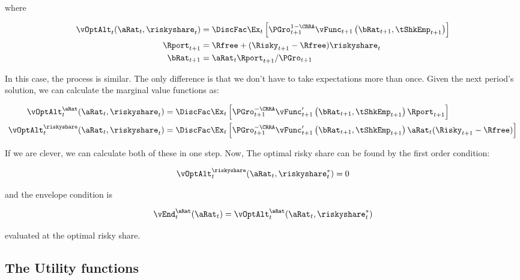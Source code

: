 \documentclass[\econtexRoot/EGMN]{subfiles}
\begin{document}
where

\begin{equation}
  \begin{split}
    \vOptAlt_{t}(\aRat_{t}, \riskyshare_{t}) & = \DiscFac \Ex_{t} \left[ \PGro_{t+1}^{1-\CRRA} \vFunc_{t+1}\left(\bRat_{t+1}, \tShkEmp_{t+1}\right)   \right] \\
    \Rport_{t+1} & = \Rfree + (\Risky_{t+1} - \Rfree) \riskyshare_{t} \\
    \bRat_{t+1} & = \aRat_{t} \Rport_{t+1} / \PGro_{t+1}
  \end{split}
\end{equation}

In this case, the process is similar. The only difference is that we don't have to take expectations more than once. Given the next period's solution, we can calculate the marginal value functions as:

\begin{equation}
  \begin{split}
    \vOptAlt_{t}^{\aRat}(\aRat_{t}, \riskyshare_{t}) & = \DiscFac \Ex_{t} \left[ \PGro_{t+1}^{-\CRRA} \vFunc_{t+1}'\left(\bRat_{t+1}, \tShkEmp_{t+1}\right) \Rport_{t+1}   \right] \\
    \vOptAlt_{t}^{\riskyshare}(\aRat_{t}, \riskyshare_{t}) & = \DiscFac \Ex_{t} \left[ \PGro_{t+1}^{-\CRRA} \vFunc_{t+1}'\left(\bRat_{t+1}, \tShkEmp_{t+1}\right) \aRat_{t} (\Risky_{t+1} - \Rfree)   \right] \\
  \end{split}
\end{equation}

If we are clever, we can calculate both of these in one step. Now, The optimal risky share can be found by the first order condition:

\begin{equation}
  \vOptAlt_{t}^{\riskyshare}(\aRat_{t}, \riskyshare_{t}^{*})  = 0
\end{equation}

and the envelope condition is

\begin{equation}
  \vEnd_{t}^{\aRat}(\aRat_{t}) = \vOptAlt_{t}^{\aRat}(\aRat_{t}, \riskyshare_{t}^{*})
\end{equation}

evaluated at the optimal risky share.

\subsection{The Utility functions}
\end{document}
